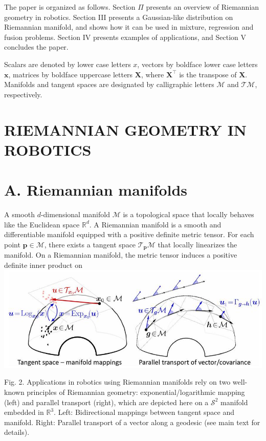 \documentclass[10pt]{article}
\begin{document}
The paper is organized as follows. Section $\Pi$ presents an overview of Riemannian geometry in robotics. Section III presents a Gaussian-like distribution on Riemannian manifold, and shows how it can be used in mixture, regression and fusion problems. Section IV presents examples of applications, and Section $\mathrm{V}$ concludes the paper.

Scalars are denoted by lower case letters $x$, vectors by boldface lower case letters $\boldsymbol{x}$, matrices by boldface uppercase letters $\boldsymbol{X}$, where $\boldsymbol{X}^{\top}$ is the transpose of $\boldsymbol{X}$. Manifolds and tangent spaces are designated by calligraphic letters $\mathcal{M}$ and $\mathcal{T} \mathcal{M}$, respectively.

\section{RIEMANNIAN GEOMETRY IN ROBOTICS}
\section{A. Riemannian manifolds}
A smooth $d$-dimensional manifold $\mathcal{M}$ is a topological space that locally behaves like the Euclidean space $\mathbb{R}^{d}$. A Riemannian manifold is a smooth and differentiable manifold equipped with a positive definite metric tensor. For each point $\boldsymbol{p} \in \mathcal{M}$, there exists a tangent space $\mathcal{T}_{\boldsymbol{p}} \mathcal{M}$ that locally linearizes the manifold. On a Riemannian manifold, the metric tensor induces a positive definite inner product on
\includegraphics[max width=\textwidth, center]{2023_01_25_b4240e152b7ba97a594cg-02}

Fig. 2. Applications in robotics using Riemannian manifolds rely on two well-known principles of Riemannian geometry: exponential/logarithmic mapping (left) and parallel transport (right), which are depicted here on a $\mathcal{S}^{2}$ manifold embedded in $\mathbb{R}^{3}$. Left: Bidirectional mappings between tangent space and manifold. Right: Parallel transport of a vector along a geodesic (see main text for details).
\end{document}
